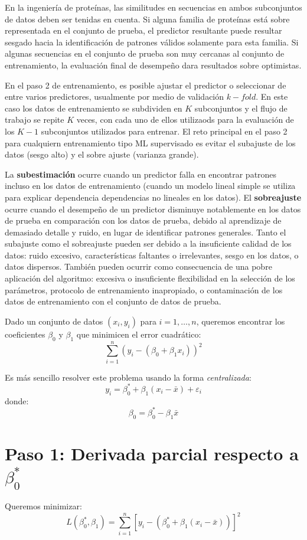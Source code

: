 \documentclass[12pt]{article}
\begin{document}
En la ingeniería de proteínas, las similitudes en secuencias en ambos subconjuntos de datos deben ser tenidas en cuenta. Si alguna familia de proteínas está sobre representada en el conjunto de prueba, el predictor resultante puede resultar sesgado hacia la identificación de patrones válidos solamente para esta familia. Si algunas secuencias en el conjunto de prueba son muy cercanas al conjunto de entrenamiento, la evaluación final de desempeño dara resultados sobre optimistas. 

En el paso 2 de entrenamiento, es posible ajustar el predictor o seleccionar de entre varios predictores, usualmente por medio de validación $k-fold$. En este caso los datos de entrenamiento se subdividen en $K$ subconjuntos y el flujo de trabajo se repite $K$ veces, con cada uno de ellos utilizaods para la evaluación de los $K-1$ subconjuntos utilizados para entrenar. El reto principal en el paso 2 para cualquiern entrenamiento tipo ML supervisado es evitar el subajuste de los datos (sesgo alto) y el sobre ajuste (varianza grande). 

La \textbf{subestimación} ocurre cuando un predictor falla en encontrar patrones incluso en los datos de entrenamiento (cuando un modelo lineal simple se utiliza para explicar dependencia dependencias no lineales en los datos). El \textbf{sobreajuste} ocurre cuando el desempeño de un predictor disminuye notablemente en los datos de prueba en comparación con los datos de prueba, debido al aprendizaje de demasiado detalle y ruido, en lugar de identificar patrones generales. Tanto el subajuste como el sobreajuste pueden ser debido a la insuficiente calidad de los datos: ruido excesivo, características faltantes o irrelevantes, sesgo en los datos, o datos dispersos. También pueden ocurrir como consecuencia de una pobre aplicación del algoritmo: excesiva o insuficiente flexibilidad en la selección de los parámetros, protocolo de entrenamiento inapropiado, o contaminación de los datos de entrenamiento con el conjunto de datos de prueba.


Dado un conjunto de datos $(x_i, y_i)$ para $i = 1, \dots, n$, queremos encontrar los coeficientes $\beta_0$ y $\beta_1$ que minimicen el error cuadr\'atico:
\[
\sum_{i=1}^{n} (y_i - (\beta_0 + \beta_1 x_i))^2
\]

Es m\'as sencillo resolver este problema usando la forma \emph{centralizada}:
\[
y_i = \beta_0^* + \beta_1(x_i - \bar{x}) + \varepsilon_i
\]
donde:
\[
\beta_0 = \beta_0^* - \beta_1 \bar{x}
\]

\section*{Paso 1: Derivada parcial respecto a \( \beta_0^* \)}
Queremos minimizar:
\[
L(\beta_0^*, \beta_1) = \sum_{i=1}^{n} [y_i - (\beta_0^* + \beta_1(x_i - \bar{x}))]^2
\]
\end{document}
